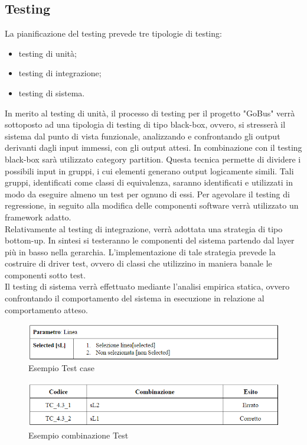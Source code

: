\subsection{Testing}
La pianificazione del testing prevede tre tipologie di testing:
\begin{itemize}
\item testing di unit\`{a};
\item testing di integrazione;
\item testing di sistema.
\end{itemize}
In merito al testing di unit\`{a}, il processo di testing per il progetto "GoBus" verr\`{a} sottoposto ad una tipologia di testing di tipo black-box, ovvero, si stresser\`{a} il sistema dal punto di vista funzionale, analizzando e confrontando gli output derivanti dagli input immessi, con gli output attesi. In combinazione con il testing black-box sar\`{a} utilizzato category partition. Questa tecnica permette di dividere i possibili input in gruppi, i cui elementi generano output logicamente simili. Tali gruppi, identificati come classi di equivalenza, saranno identificati e utilizzati in modo da eseguire almeno un test per ognuno di essi. Per agevolare il testing di regressione, in seguito alla modifica delle componenti software verr\`{a} utilizzato un framework adatto.\\
Relativamente al testing di integrazione, verr\`{a} adottata una strategia di tipo bottom-up. In sintesi si testeranno le componenti del sistema partendo dal layer pi\`{u} in basso nella gerarchia. L\rq implementazione di tale strategia prevede la costruire di driver test, ovvero di classi che utilizzino in maniera banale le componenti sotto test.\\
Il testing di sistema verr\`{a} effettuato mediante l\rq analisi empirica statica, ovvero confrontando il comportamento del sistema in esecuzione in relazione al comportamento atteso.\\

\begin{figure}[h]
\centering
\includegraphics[scale=.6]{img/21.png}
\caption{Esempio Test case }
\label{fig:mhs}
\end{figure}  

\begin{figure}[h]
\centering
\includegraphics[scale=.6]{img/22.png}
\caption{Esempio combinazione Test}
\label{fig:mhs}
\end{figure} 

